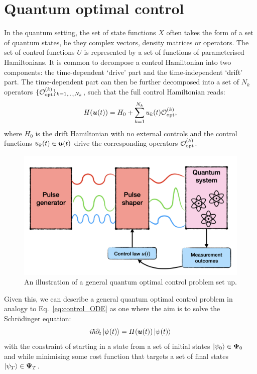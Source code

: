 \section{Quantum optimal control}\label{sec:3.2_Quantum_optimal_control}


In the quantum setting, the set of state functions $X$ often takes the form of a set of quantum states, be they complex vectors, density matrices or operators. The set of control functions $U$ is represented by a set of functions of parameterised Hamiltonians. It is common to decompose a control Hamiltonian into two components: the time-dependent `drive' part and the time-independent `drift' part. The time-dependent part can then be further decomposed into a set of $N_k$ operators $\{\mathcal{O}_{\rm opt}^{(k)}\}_{k=1,...,N_k}$, such that the full control Hamiltonian reads:
\begin{equation}
    H(\boldsymbol{u}(t)) = H_0 + \sum_{k = 1}^{N_k} u_k(t) \mathcal{O}_{\rm opt}^{(k)},
\end{equation}
where $H_0$ is the drift Hamiltonian with no external controls and the control functions $u_k(t) \in \boldsymbol{u}(t)$ drive the corresponding operators $\mathcal{O}_{\rm opt}^{(k)}$.

\begin{figure}[t]
\centering
\includegraphics[width=0.8\linewidth]{images/optimal_control_placeholder.png} \caption[Schematic diagram of quantum optimal control]{An illustration of a general quantum optimal control problem set up. }\label{fig:quantum_optimal_control}
\end{figure}

Given this, we can describe a general quantum optimal control problem in analogy to Eq.~\eqref{eq:control_ODE} as one where the aim is to solve the Schr\"{o}dinger equation:
\begin{equation}
    i \hbar \partial_t \ket{\psi(t)} = H(\boldsymbol{u}(t))\ket{\psi(t)}
\end{equation}
with the constraint of starting in a state from a set of initial states $\ket{\psi_0} \in \boldsymbol \Psi_0$ and while minimising some cost function that targets a set of final states $\ket{\psi_T} \in \boldsymbol \Psi_T$.


